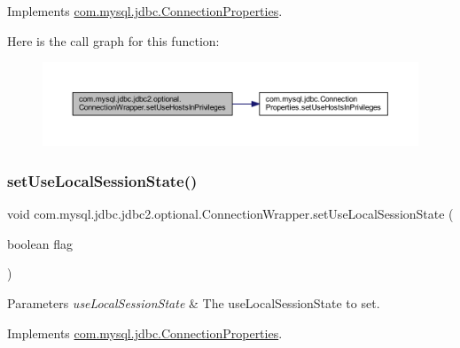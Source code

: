 Implements \mbox{\hyperlink{interfacecom_1_1mysql_1_1jdbc_1_1_connection_properties_aefb08a45df4754d8d6c96b06d36991b5}{com.\+mysql.\+jdbc.\+Connection\+Properties}}.

Here is the call graph for this function\+:
\nopagebreak
\begin{figure}[H]
\begin{center}
\leavevmode
\includegraphics[width=350pt]{classcom_1_1mysql_1_1jdbc_1_1jdbc2_1_1optional_1_1_connection_wrapper_a5d5646bf3f93b51fcf264bec6c2aacf1_cgraph}
\end{center}
\end{figure}
\mbox{\label{classcom_1_1mysql_1_1jdbc_1_1jdbc2_1_1optional_1_1_connection_wrapper_aad66241cb376c51b566660d1027e6b14}} 
\subsubsection{\texorpdfstring{set\+Use\+Local\+Session\+State()}{setUseLocalSessionState()}}
{\footnotesize\ttfamily void com.\+mysql.\+jdbc.\+jdbc2.\+optional.\+Connection\+Wrapper.\+set\+Use\+Local\+Session\+State (\begin{DoxyParamCaption}\item[{boolean}]{flag }\end{DoxyParamCaption})}


\begin{DoxyParams}{Parameters}
{\em use\+Local\+Session\+State} & The use\+Local\+Session\+State to set. \\
\hline
\end{DoxyParams}


Implements \mbox{\hyperlink{interfacecom_1_1mysql_1_1jdbc_1_1_connection_properties_a27a764e918cf2d90a6bbedec87ce6820}{com.\+mysql.\+jdbc.\+Connection\+Properties}}.

